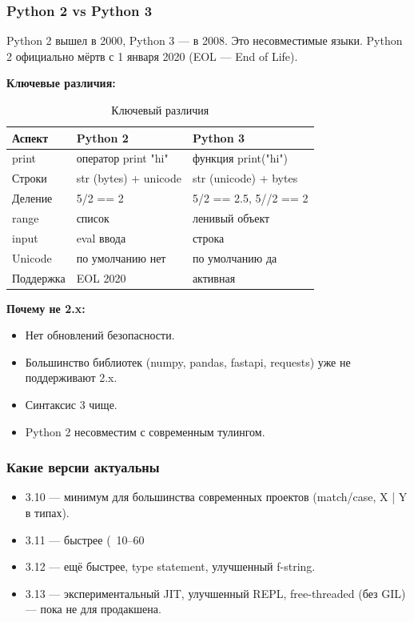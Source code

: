 \subsubsection{Python 2 vs Python 3}

Python 2 вышел в 2000, Python 3 — в 2008. Это несовместимые языки. Python 2 официально мёртв с 1 января 2020 (EOL — End of Life).

\textbf{Ключевые различия:}
\begin{table}[h]
\centering
\begin{tabular}{|l|l|l|}
\hline
\textbf{Аспект}& \textbf{Python 2} & \textbf{Python 3} \\
\hline
print & оператор print "hi" & функция print("hi") \\
Строки & str (bytes) + unicode & str (unicode) + bytes \\
Деление & 5/2 == 2 & 5/2 == 2.5, 5//2 == 2 \\
range & список & ленивый объект \\
input & eval ввода & строка \\
Unicode & по умолчанию нет & по умолчанию да \\
Поддержка & EOL 2020 & активная \\
\hline
\end{tabular}
\caption{Ключевый различия}
\end{table}

\textbf{Почему не 2.x:}
\begin{itemize}
\item Нет обновлений безопасности.
\item Большинство библиотек (numpy, pandas, fastapi, requests) уже не поддерживают 2.x.
\item Синтаксис 3 чище.
\item Python 2 несовместим с современным тулингом.
\end{itemize}

\subsubsection{ Какие версии актуальны}
\begin{itemize}
\item 3.10 — минимум для большинства современных проектов (match/case, X | Y в типах).
\item 3.11 — быстрее (~10–60%
\item 3.12 — ещё быстрее, type statement, улучшенный f-string.
\item 3.13 — экспериментальный JIT, улучшенный REPL, free-threaded (без GIL) — пока не для продакшена.
\end{itemize}

